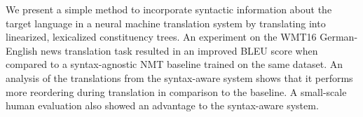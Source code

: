 We present a simple method to incorporate syntactic information about the target language in a neural machine translation system by translating into linearized, lexicalized constituency trees. An experiment on the WMT16 German-English news translation task resulted in an improved BLEU score when compared to a syntax-agnostic NMT baseline trained on the same dataset. An analysis of the translations from the syntax-aware system shows that it performs more reordering during translation in comparison to the baseline. A small-scale human evaluation also showed an advantage to the syntax-aware system.
